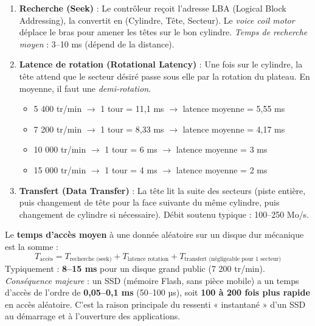\documentclass[11pt]{article}
\begin{document}
\begin{methode}
\begin{enumerate}
    \item \textbf{Recherche (Seek)} : Le contrôleur reçoit l'adresse LBA (Logical Block Addressing), la convertit en (Cylindre, Tête, Secteur). Le \emph{voice coil motor} déplace le bras pour amener les têtes sur le bon cylindre. \emph{Temps de recherche moyen} : 3--10 ms (dépend de la distance).
    \item \textbf{Latence de rotation (Rotational Latency)} : Une fois sur le cylindre, la tête attend que le secteur désiré passe sous elle par la rotation du plateau. En moyenne, il faut une \emph{demi-rotation}.
    \begin{itemize}
        \item 5 400 tr/min $\rightarrow$ 1 tour = 11,1 ms $\rightarrow$ latence moyenne = 5,55 ms
        \item 7 200 tr/min $\rightarrow$ 1 tour = 8,33 ms $\rightarrow$ latence moyenne = 4,17 ms
        \item 10 000 tr/min $\rightarrow$ 1 tour = 6 ms $\rightarrow$ latence moyenne = 3 ms
        \item 15 000 tr/min $\rightarrow$ 1 tour = 4 ms $\rightarrow$ latence moyenne = 2 ms
    \end{itemize}
    \item \textbf{Transfert (Data Transfer)} : La tête lit la suite des secteurs (piste entière, puis changement de tête pour la face suivante du même cylindre, puis changement de cylindre si nécessaire). Débit soutenu typique : 100--250 Mo/s.
\end{enumerate}
\end{methode}

\begin{propriete}
Le \textbf{temps d'accès moyen} à une donnée aléatoire sur un disque dur mécanique est la somme :
\[
T_{\text{accès}} = T_{\text{recherche (seek)}} + T_{\text{latence rotation}} + T_{\text{transfert (négligeable pour 1 secteur)}}
\]
Typiquement : \textbf{8--15 ms} pour un disque grand public (7 200 tr/min).
\emph{Conséquence majeure} : un SSD (mémoire Flash, sans pièce mobile) a un temps d'accès de l'ordre de \textbf{0,05--0,1 ms} (50--100 µs), soit \textbf{100 à 200 fois plus rapide} en accès aléatoire. C'est la raison principale du ressenti « instantané » d'un SSD au démarrage et à l'ouverture des applications.
\end{propriete}
\end{document}
